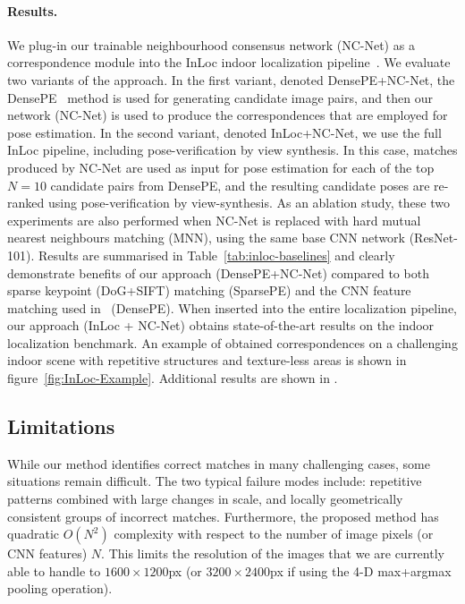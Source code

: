 \documentclass{article}
\begin{document}
\paragraph{Results.}
We plug-in our trainable neighbourhood consensus network (NC-Net) as a correspondence module into the InLoc indoor localization pipeline~\cite{Taira18}. We evaluate two variants of the approach. In the first variant, denoted DensePE+NC-Net,
the DensePE~\cite{Taira18} method is used for generating candidate image pairs, and then our network (NC-Net) is used to produce the correspondences that are employed for pose estimation.
In the second variant, denoted InLoc+NC-Net, we use the full InLoc pipeline, including pose-verification by view synthesis. In this case, matches produced by NC-Net are used as input for pose estimation for each of the top $N=10$ candidate pairs from DensePE, and the resulting candidate poses are re-ranked using pose-verification by view-synthesis.
As an ablation study, these two experiments are also performed when NC-Net is replaced with hard mutual nearest neighbours matching (MNN), using the same base CNN network (ResNet-101).
Results are summarised in Table~\ref{tab:inloc-baselines} and clearly demonstrate benefits of our approach ({DensePE+NC-Net}) compared to both sparse keypoint (DoG+SIFT) matching ({SparsePE}) and the CNN feature matching used in~\cite{Taira18} ({DensePE}). When inserted into the entire localization pipeline, our approach ({InLoc + NC-Net}) obtains state-of-the-art results on the indoor localization benchmark.
An example of obtained correspondences on a challenging indoor scene with repetitive structures and texture-less areas is shown in figure~\ref{fig:InLoc-Example}.
Additional results are shown in .

\subsection{Limitations}
While our method identifies correct matches in many challenging cases, some situations remain difficult. The two typical failure modes include: repetitive patterns combined with large changes in scale, and locally geometrically consistent groups of incorrect matches. Furthermore, the proposed method has quadratic $O(N^2)$ complexity with respect to the number of image pixels (or CNN features) $N$. This limits the resolution of the images that we are currently able to handle to $1600\times1200$px (or $3200\times2400$px if using the 4-D max+argmax pooling operation).
\end{document}
